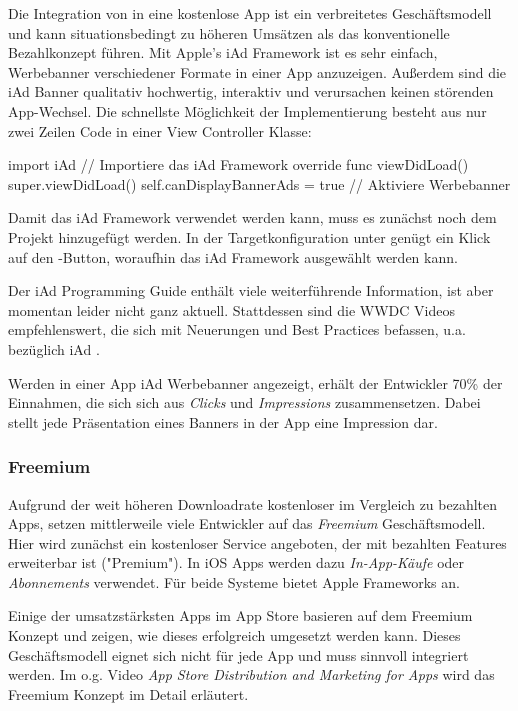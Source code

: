 \documentclass[parskip=half, final]{scrreprt}
\begin{document}
Die Integration von  in eine kostenlose App ist ein verbreitetes Geschäftsmodell und kann situationsbedingt zu höheren Umsätzen als das konventionelle Bezahlkonzept führen. Mit Apple's iAd Framework ist es sehr einfach, Werbebanner verschiedener Formate in einer App anzuzeigen. Außerdem sind die iAd Banner qualitativ hochwertig, interaktiv und verursachen keinen störenden App-Wechsel. Die schnellste Möglichkeit der Implementierung besteht aus nur zwei Zeilen Code in einer View Controller Klasse:

\begin{swiftcode}
import iAd // Importiere das iAd Framework
override func viewDidLoad() {
    super.viewDidLoad()
    self.canDisplayBannerAds = true // Aktiviere Werbebanner
}
\end{swiftcode}

Damit das iAd Framework verwendet werden kann, muss es zunächst noch dem Projekt hinzugefügt werden. In der Targetkonfiguration  unter  genügt ein Klick auf den \menu{+}-Button, woraufhin das iAd Framework ausgewählt werden kann.

Der iAd Programming Guide  enthält viele weiterführende Information, ist aber momentan leider nicht ganz aktuell. Stattdessen sind die WWDC Videos empfehlenswert, die sich mit Neuerungen und Best Practices befassen, u.a. bezüglich iAd .

Werden in einer App iAd Werbebanner angezeigt, erhält der Entwickler 70\% der Einnahmen, die sich sich aus \emph{Clicks} und \emph{Impressions} zusammensetzen. Dabei stellt jede Präsentation eines Banners in der App eine Impression dar.

\subsubsection{Freemium}

Aufgrund der weit höheren Downloadrate kostenloser im Vergleich zu bezahlten Apps, setzen mittlerweile viele Entwickler auf das \emph{Freemium} Geschäftsmodell. Hier wird zunächst ein kostenloser Service angeboten, der mit bezahlten Features erweiterbar ist ("Premium"). In iOS Apps werden dazu \emph{In-App-Käufe} oder \emph{Abonnements} verwendet. Für beide Systeme bietet Apple Frameworks an.

Einige der umsatzstärksten Apps im App Store basieren auf dem Freemium Konzept und zeigen, wie dieses erfolgreich umgesetzt werden kann. Dieses Geschäftsmodell eignet sich nicht für jede App und muss sinnvoll integriert werden. Im o.g. Video \emph{App Store Distribution and Marketing for Apps} wird das Freemium Konzept im Detail erläutert.
\end{document}
